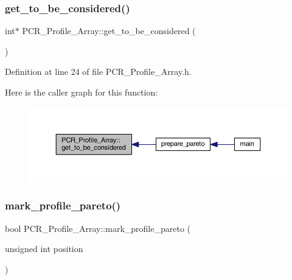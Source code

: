 \mbox{\label{class_p_c_r___profile___array_ac05cfcb1d903bd46fb83ab32533f8fce}} 
\subsubsection{\texorpdfstring{get\+\_\+to\+\_\+be\+\_\+considered()}{get\_to\_be\_considered()}}
{\footnotesize\ttfamily int$\ast$ P\+C\+R\+\_\+\+Profile\+\_\+\+Array\+::get\+\_\+to\+\_\+be\+\_\+considered (\begin{DoxyParamCaption}{ }\end{DoxyParamCaption})\hspace{0.3cm}{\ttfamily [inline]}}



Definition at line 24 of file P\+C\+R\+\_\+\+Profile\+\_\+\+Array.\+h.

Here is the caller graph for this function\+:
\nopagebreak
\begin{figure}[H]
\begin{center}
\leavevmode
\includegraphics[width=350pt]{class_p_c_r___profile___array_ac05cfcb1d903bd46fb83ab32533f8fce_icgraph}
\end{center}
\end{figure}
\mbox{\label{class_p_c_r___profile___array_a57b22954d1a22097d45dc9083d147605}} 
\subsubsection{\texorpdfstring{mark\+\_\+profile\+\_\+pareto()}{mark\_profile\_pareto()}}
{\footnotesize\ttfamily bool P\+C\+R\+\_\+\+Profile\+\_\+\+Array\+::mark\+\_\+profile\+\_\+pareto (\begin{DoxyParamCaption}\item[{unsigned int}]{position }\end{DoxyParamCaption})}



